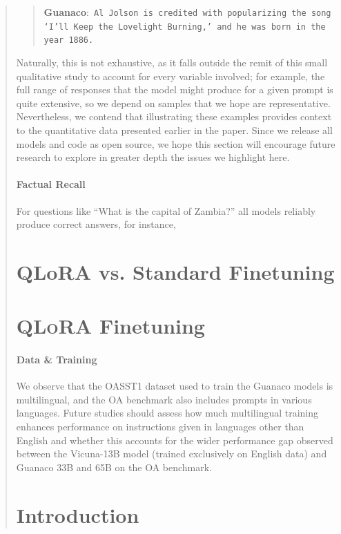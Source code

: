 \begin{quote}
\begin{quote}
     \textbf{Guanaco}:~\texttt{Al Jolson is credited with popularizing the song `I'll Keep the Lovelight Burning,' and he was born in the year 1886.}
 \end{quote}

Naturally, this is not exhaustive, as it falls outside the remit of this small qualitative study to account for every variable involved; for example, the full range of responses that the model might produce for a given prompt is quite extensive, so we depend on samples that we hope are representative. Nevertheless, we contend that illustrating these examples provides context to the quantitative data presented earlier in the paper. Since we release all models and code as open source, we hope this section will encourage future research to explore in greater depth the issues we highlight here.  
\paragraph{Factual Recall} For questions like ``What is the capital of Zambia?'' all models reliably produce correct answers, for instance,

\section{QLoRA vs. Standard Finetuning}
\label{sec:comp_to_std}

\section{\textsc{QLoRA} Finetuning}

\paragraph{Data \& Training} We observe that the OASST1 dataset used to train the {Guanaco} models is multilingual, and the OA benchmark also includes prompts in various languages. Future studies should assess how much multilingual training enhances performance on instructions given in languages other than English and whether this accounts for the wider performance gap observed between the Vicuna-13B model (trained exclusively on English data) and {Guanaco} 33B and 65B on the OA benchmark.

\section{Introduction}


\end{quote}
